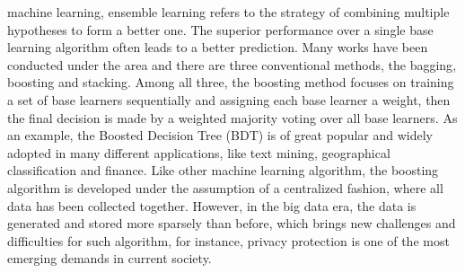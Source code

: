 \documentclass[10pt,journal,compsoc]{IEEEtran}
\begin{document}
\IEEEdisplaynontitleabstractindextext




\IEEEpeerreviewmaketitle








machine learning, ensemble learning\cite{hansen1990neural} refers to the strategy of combining multiple hypotheses to form a better one. The superior performance over a single base learning algorithm often leads to a better prediction. Many works have been conducted under the area and there are three conventional methods, the bagging\cite{breiman1996bagging}, boosting\cite{schapire1990strength,freund1997decision} and stacking\cite{wolpert1992stacked}. Among all three, the boosting method focuses on training a set of base learners sequentially and assigning each base learner a weight, then the final decision is made by a weighted majority voting over all base learners. As an example, the Boosted Decision Tree (BDT) is of great popular and widely adopted in many different applications, like text mining\cite{apte1998text}, geographical classification\cite{pal2003assessment} and finance\cite{xia2017boosted}. Like other machine learning algorithm, the boosting algorithm is developed under the assumption of a centralized fashion, where all data has been collected together. However, in the big data era, the data is generated and stored more sparsely than before, which brings new challenges and difficulties for such algorithm, for instance, privacy protection is one of the most emerging demands in current society.
\end{document}
